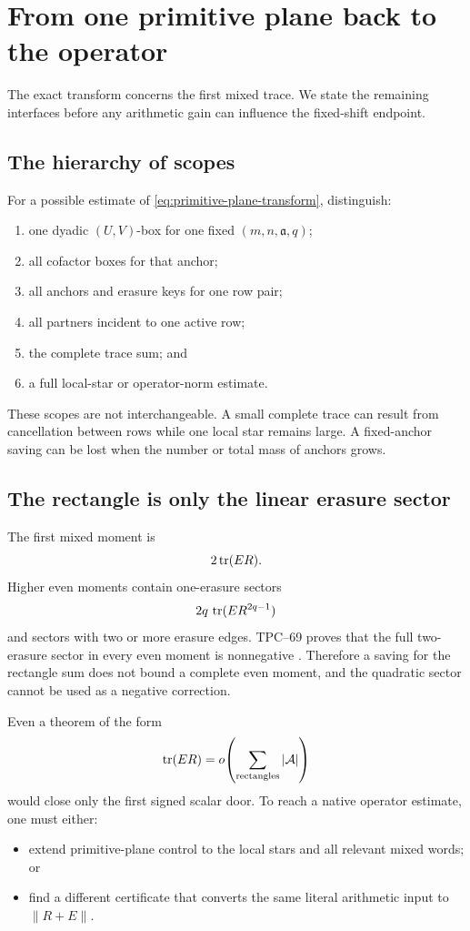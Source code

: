 \section{From one primitive plane back to the operator}
\label{sec:operator-ledger}

The exact transform concerns the first mixed trace.  We state the
remaining interfaces before any arithmetic gain can influence the
fixed-shift endpoint.

\subsection{The hierarchy of scopes}

For a possible estimate of
\eqref{eq:primitive-plane-transform}, distinguish:
\begin{enumerate}[label=\textup{(\roman*)},leftmargin=3em]
 \item one dyadic \((U,V)\)-box for one fixed
       \((m,n,\mathfrak a,q)\);
 \item all cofactor boxes for that anchor;
 \item all anchors and erasure keys for one row pair;
 \item all partners incident to one active row;
 \item the complete trace sum; and
 \item a full local-star or operator-norm estimate.
\end{enumerate}
These scopes are not interchangeable.  A small complete trace can result
from cancellation between rows while one local star remains large.  A
fixed-anchor saving can be lost when the number or total mass of anchors
grows.

\subsection{The rectangle is only the linear erasure sector}

The first mixed moment is
\[
 2\operatorname{tr}(ER).
\]
Higher even moments contain one-erasure sectors
\[
 2q\,\operatorname{tr}(ER^{2q-1})
\]
and sectors with two or more erasure edges.  TPC--69 proves that the full
two-erasure sector in every even moment is nonnegative
\citep{WangTPC69}.  Therefore a saving for the rectangle sum does not
bound a complete even moment, and the quadratic sector cannot be used as
a negative correction.

Even a theorem of the form
\[
 \operatorname{tr}(ER)=o\!\left(\sum_{\text{rectangles}}|\mathcal A|\right)
\]
would close only the first signed scalar door.  To reach a native
operator estimate, one must either:
\begin{itemize}
 \item extend primitive-plane control to the local stars and all relevant
       mixed words; or
 \item find a different certificate that converts the same literal
       arithmetic input to \(\|R+E\|\).
\end{itemize}

